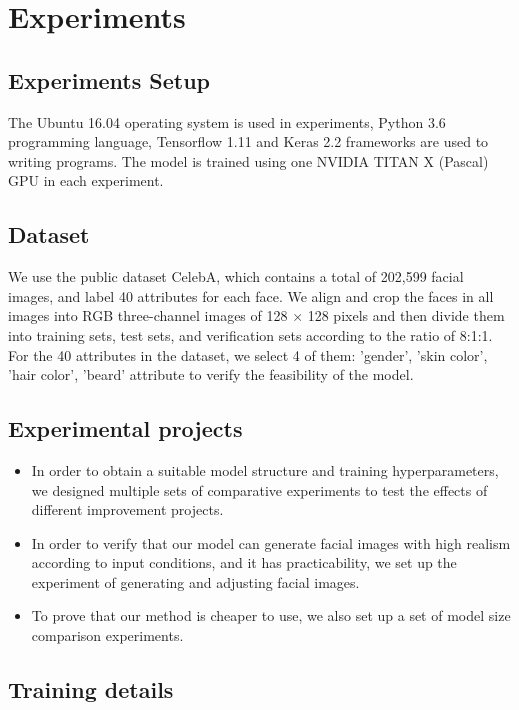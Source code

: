 \section{Experiments}

\subsection{Experiments Setup}
The Ubuntu 16.04 operating system is used in experiments, Python 3.6 programming language, Tensorflow 1.11 and Keras 2.2 frameworks are used to writing programs.
The model is trained using one NVIDIA TITAN X (Pascal) GPU in each experiment.

\subsection{Dataset}
We use the public dataset CelebA, which contains a total of 202,599 facial images, and label 40 attributes for each face.
We align and crop the faces in all images into RGB three-channel images of 128 × 128 pixels and then divide them into training sets, test sets, and verification sets according to the ratio of 8:1:1.
For the 40 attributes in the dataset, we select 4 of them: 'gender', 'skin color', 'hair color', 'beard' attribute to verify the feasibility of the model.

\subsection{Experimental projects}
\begin{itemize}
\item In order to obtain a suitable model structure and training hyperparameters, we designed multiple sets of comparative experiments to test the effects of different improvement projects.
\item In order to verify that our model can generate facial images with high realism according to input conditions, and it has practicability, we set up the experiment of generating and adjusting facial images.
\item To prove that our method is cheaper to use, we also set up a set of model size comparison experiments.
\end{itemize}

\subsection{Training details}

